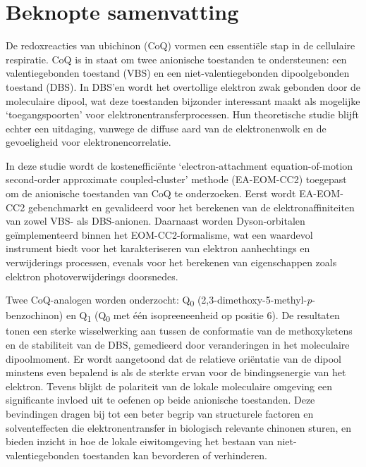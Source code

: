 \chapter*{Beknopte samenvatting}


De redoxreacties van ubichinon (CoQ) vormen een essentiële stap in de cellulaire respiratie. CoQ is in staat om twee anionische toestanden te ondersteunen: een valentiegebonden toestand (VBS) en een niet-valentiegebonden dipoolgebonden toestand (DBS). In DBS’en wordt het overtollige elektron zwak gebonden door de moleculaire dipool, wat deze toestanden bijzonder interessant maakt als mogelijke ‘toegangspoorten’ voor elektronentransferprocessen. Hun theoretische studie blijft echter een uitdaging, vanwege de diffuse aard van de elektronenwolk en de gevoeligheid voor elektronencorrelatie.

In deze studie wordt de kostenefficiënte `electron-attachment equation-of-motion second-order approximate coupled-cluster' methode (EA-EOM-CC2) toegepast om de anionische toestanden van CoQ te onderzoeken. Eerst wordt EA-EOM-CC2 gebenchmarkt en gevalideerd voor het berekenen van de elektronaffiniteiten van zowel VBS- als DBS-anionen. Daarnaast worden Dyson-orbitalen geïmplementeerd binnen het EOM-CC2-formalisme, wat een waardevol instrument biedt voor het karakteriseren van elektron aanhechtings en verwijderings processen, evenals voor het berekenen van eigenschappen zoals elektron photoverwijderings doorsnedes.

Twee CoQ-analogen worden onderzocht: Q\textsubscript{0} (2,3-dimethoxy-5-methyl-\textit{p}-benzochinon) en Q\textsubscript{1} (Q\textsubscript{0} met één isopreeneenheid op positie 6). De resultaten tonen een sterke wisselwerking aan tussen de conformatie van de methoxyketens en de stabiliteit van de DBS, gemedieerd door veranderingen in het moleculaire dipoolmoment. Er wordt aangetoond dat de relatieve oriëntatie van de dipool minstens even bepalend is als de sterkte ervan voor de bindingsenergie van het elektron. Tevens blijkt de polariteit van de lokale moleculaire omgeving een significante invloed uit te oefenen op beide anionische toestanden. Deze bevindingen dragen bij tot een beter begrip van structurele factoren en solventeffecten die elektronentransfer in biologisch relevante chinonen sturen, en bieden inzicht in hoe de lokale eiwitomgeving het bestaan van niet-valentiegebonden toestanden kan bevorderen of verhinderen.

\cleardoublepage

